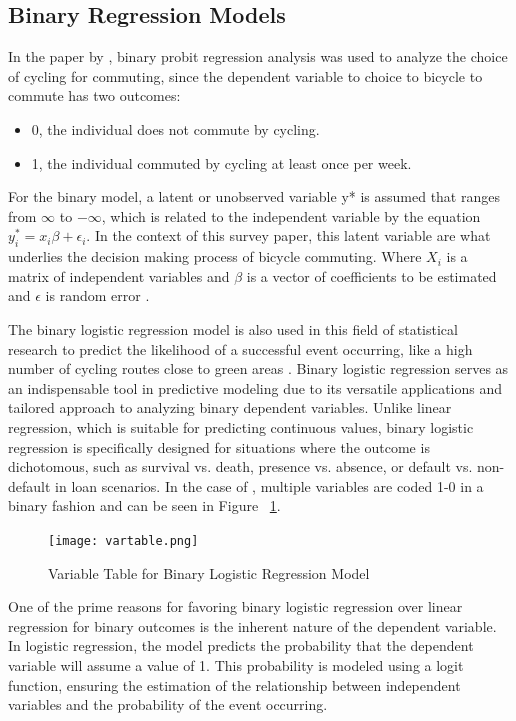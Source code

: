 \documentclass[12pt, letterpaper]{article}
\begin{document}
\subsection{Binary Regression Models}
\label{sec:bin}

In the paper by \citet{2Yujun2019}, binary probit regression analysis was used to analyze the choice of cycling for commuting, since the dependent variable to choice to bicycle to commute has two outcomes:

\begin{itemize}
    \item 0, the individual does not commute by cycling.
    \item 1, the individual commuted by cycling at least once per week.
\end{itemize}
    
For the binary model, a latent or unobserved variable y* is assumed that ranges from $\infty$ to $-\infty$, which is related to the independent variable by the equation $y^{*}_{i} = x_{i}\beta + \epsilon_{i}$. In the context of this survey paper, this latent variable are what underlies the decision making process of bicycle commuting. Where $X_{i}$ is a matrix of independent variables and $\beta$ is a vector of coefficients to be estimated and $\epsilon$ is random error \cite{LONG2001}. 

The binary logistic regression model is also used in this field of statistical research to predict the likelihood of a successful event occurring, like a high number of cycling routes close to green areas \cite{5CamposSnchez2019}. Binary logistic regression serves as an indispensable tool in predictive modeling due to its versatile applications and tailored approach to analyzing binary dependent variables. Unlike linear regression, which is suitable for predicting continuous values, binary logistic regression is specifically designed for situations where the outcome is dichotomous, such as survival vs. death, presence vs. absence, or default vs. non-default in loan scenarios. In the case of \citet{5CamposSnchez2019}, multiple variables are coded 1-0 in a binary fashion and can be seen in Figure ~\ref{fig:vartable}. \par
\begin{figure}[hbt!]
    \centering \texttt{[image: vartable.png]}
    \caption{Variable Table for Binary Logistic Regression Model}
    \label{fig:vartable}
\end{figure}

One of the prime reasons for favoring binary logistic regression over linear regression for binary outcomes is the inherent nature of the dependent variable. In logistic regression, the model predicts the probability that the dependent variable will assume a value of 1. This probability is modeled using a logit function, ensuring the estimation of the relationship between independent variables and the probability of the event occurring.
\end{document}
